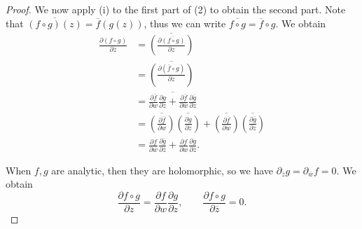 \documentclass[11pt, letterpaper]{article}
\theoremstyle{plain}
\begin{document}
\begin{proof}
	We now apply (i) to the first part of (2) to obtain the second part. Note that $\overline{(f\circ g)(z)} =\overline{f} (g(z))$, thus we can write $\overline{f\circ g} =\overline{f} \circ g$. We obtain
	\begin{align*}
		\frac{\partial (f\circ g)}{\partial \overline{z} } &= \overline{\left( \frac{\partial \overline{(f\circ g)} }{\partial z}  \right) } \\
								   &= \overline{\left( \frac{\partial (\overline{f} \circ g)}{\partial z}  \right) } \\
								   &=\overline{\frac{\partial \overline{f} }{\partial w} \frac{\partial g}{\partial z} +\frac{\partial \overline{f} }{\partial \overline{w} } \frac{\partial \overline{g} }{\partial z} } \\
								   &=\overline{\left( \frac{\partial \overline{f} }{\partial w}  \right) } \overline{\left( \frac{\partial g}{\partial z}  \right) } + \overline{\left( \frac{\partial \overline{f} }{\partial \overline{w} }  \right) } \overline{\left( \frac{\partial \overline{g} }{\partial z}  \right) } \\
								   &=\frac{\partial f}{\partial \overline{w} } \frac{\partial \overline{g} }{\partial \overline{z} } +\frac{\partial f}{\partial w} \frac{\partial g}{\partial \overline{z} } 
	.\end{align*}

	

	When $f,g$ are analytic, then they are holomorphic, so we have $\partial _{\overline{z} } g=\partial_{\overline{w} } f=0$. We obtain
	\[
		\frac{\partial f\circ g}{\partial z} =\frac{\partial f}{\partial w} \frac{\partial g}{\partial z} ,\qquad \frac{\partial f\circ g}{\partial \overline{z} } =0
	.\]
\end{proof}
\end{document}
